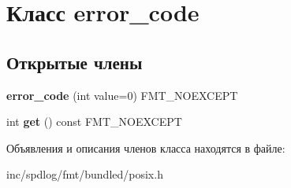 \hypertarget{classerror__code}{}\section{Класс error\+\_\+code}
\label{classerror__code}
\subsection*{Открытые члены}
\begin{DoxyCompactItemize}
\item 
\mbox{\label{classerror__code_a213366e7f3bdbd15b0753c2592d816ed}} 
{\bfseries error\+\_\+code} (int value=0) F\+M\+T\+\_\+\+N\+O\+E\+X\+C\+E\+PT
\item 
\mbox{\label{classerror__code_af42e923dd7f4e8451445341eade677c4}} 
int {\bfseries get} () const F\+M\+T\+\_\+\+N\+O\+E\+X\+C\+E\+PT
\end{DoxyCompactItemize}


Объявления и описания членов класса находятся в файле\+:\begin{DoxyCompactItemize}
\item 
inc/spdlog/fmt/bundled/posix.\+h\end{DoxyCompactItemize}
